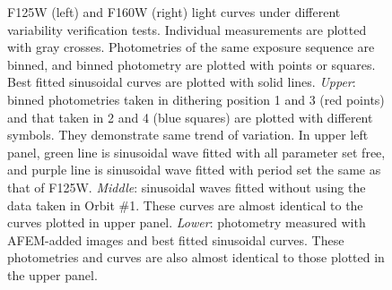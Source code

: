 \documentclass[apj]{emulateapj}
\begin{document}



 \begin{figure}
  \centering
  \caption{F125W (left) and F160W (right) light curves under different
  variability verification tests. Individual measurements are plotted with gray
  crosses. Photometries of the same exposure sequence are binned, and
  binned photometry are  plotted with points or squares. Best fitted sinusoidal
  curves are plotted with solid lines. {\em Upper}: binned photometries taken
in dithering position 1 and 3 (red points) and that taken in 2 and 4
(blue squares) are plotted with different symbols. They demonstrate same trend of
variation. In upper left panel, green line is sinusoidal wave fitted with all
parameter set free, and purple line is sinusoidal wave fitted with period set the same as that
of F125W. {\em
  Middle}: sinusoidal waves fitted without using the data taken in
Orbit \#1. These curves are almost identical to the curves
plotted in upper panel. {\em Lower}: photometry measured with
AFEM-added images and best fitted sinusoidal curves. These photometries and curves are also almost identical to
those plotted in the upper panel.}
  \label{fig:2}
\end{figure}
\end{document}
